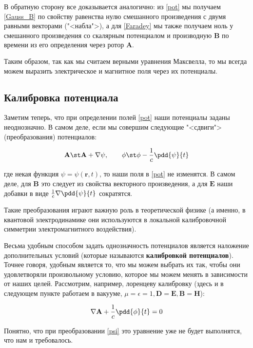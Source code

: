\documentclass[12pt]{kiarticle}
\begin{document}
В обратную сторону все доказывается аналогично: из \eqref{pot} мы получаем \eqref{Gauss_B} по свойству равенства нулю смешанного произведения с двумя равными векторами ("<набла">), а для  \eqref{Faradey} мы также получаем ноль у смешанного произведения со скалярным потенциалом и производную $ \mathbf{B} $ по времени из его определения через ротор $ \mathbf{A} $.

Таким образом, так как мы считаем верными уравнения Максвелла, то мы всегда можем выразить электрическое и магнитное поля через их потенциалы.

\subsection{Калибровка потенциала}

Заметим теперь, что при определении полей \eqref{pot} наши потенциалы заданы неоднозначно. В самом деле, если мы совершим следующие "<сдвиги"> (преобразования) потенциалов: 

\begin{equation}\label{psi}
\mathbf{A} \st \mathbf{A} + \nabla \psi, \qquad \phi \st \phi - \dfrac{1}{c} \pdd{\psi}{t}
\end{equation}

где некая функция $ \psi = \psi(\mathbf{r}, t) $, то наши поля в \eqref{pot} не изменятся. В самом деле, для $ \mathbf{B}  $ это следует из свойства векторного произведения, а для $ \mathbf{E} $ наши добавки в виде $ \frac{1}{c} \nabla \pdd{\psi}{t} $ сократятся. 

Такие преобразования играют важную роль в теоретической физике (а именно, в квантовой электродинамике они используются в локальной калибровочной симметрии электромагнитного воздействия). 

Весьма удобным способом задать однозначность потенциалов является наложение дополнительных условий (которые называются \textbf{калибровкой потенциалов}). Точнее говоря, удобным является то, что мы можем выбрать их так, чтобы они удовлетворяли произвольному условию, которое мы можем менять в зависимости от наших целей. Рассмотрим, например, лоренцеву калибровку (здесь и в следующем пункте работаем в вакууме, $ \mu = \epsilon = 1, \mathbf{D} = \mathbf{E}, \mathbf{B} = \mathbf{H} $): 

\begin{equation}\label{Lorents}
\nabla \mathbf{A}+ \dfrac{1}{c} \pdd{\phi}{t} = 0
\end{equation}

Понятно, что при преобразовании \eqref{psi} это уравнение уже не будет выполнятся, что нам и требовалось.
\end{document}

